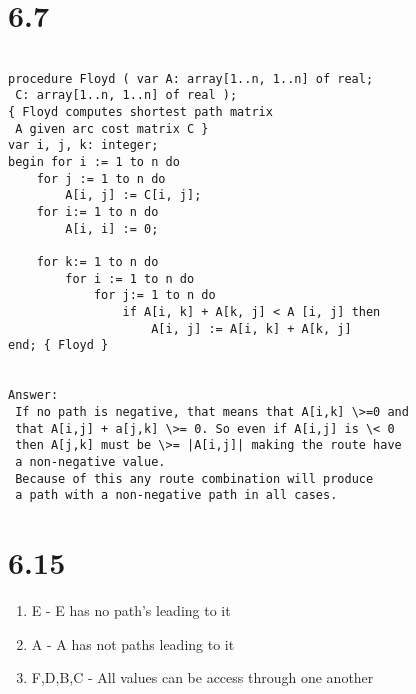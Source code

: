\documentclass{article}
\begin{document}
		\section{6.7}
		\begin{lstlisting}
		
procedure Floyd ( var A: array[1..n, 1..n] of real;
 C: array[1..n, 1..n] of real );
{ Floyd computes shortest path matrix
 A given arc cost matrix C }
var i, j, k: integer;
begin for i := 1 to n do 
	for j := 1 to n do 
		A[i, j] := C[i, j]; 
	for i:= 1 to n do 
		A[i, i] := 0;

	for k:= 1 to n do
		for i := 1 to n do
			for j:= 1 to n do
				if A[i, k] + A[k, j] < A [i, j] then
					A[i, j] := A[i, k] + A[k, j]
end; { Floyd }


Answer:
 If no path is negative, that means that A[i,k] \>=0 and
 that A[i,j] + a[j,k] \>= 0. So even if A[i,j] is \< 0
 then A[j,k] must be \>= |A[i,j]| making the route have
 a non-negative value.
 Because of this any route combination will produce
 a path with a non-negative path in all cases.
		\end{lstlisting}



		\section{6.15}
		\begin{enumerate}
			\item E - E has no path's leading to it
			\item A - A has not paths leading to it
			\item F,D,B,C - All values can be access through one another
		\end{enumerate}
		
		
\end{document}
